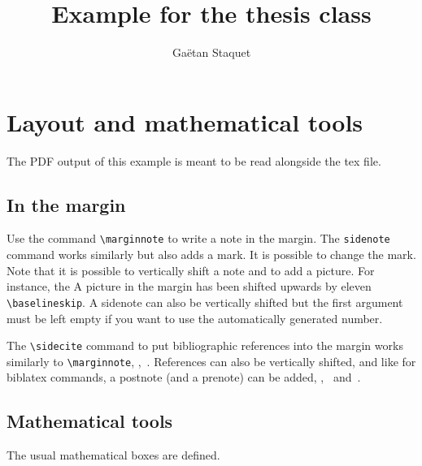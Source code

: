\documentclass[
  b5paper,
  fontsize = 11pt,
  english,
  roman equations,
]{thesis}
\title{Example for the thesis class}
\author{Gaëtan Staquet}
\begin{document}
  \frontmatter
  \maketitle

  \tableofcontents

  \mainmatter

  \chapter{Layout and mathematical tools}

  The PDF output of this example is meant to be read alongside the tex file.

  \chapterTOC

  \section{In the margin}

  Use the command \verb!\marginnote! to write a note in the margin.
  The \verb!sidenote! command works similarly but also adds a mark.
  It is possible to change the mark.
  Note that it is possible to vertically shift a note and to add a picture.
  For instance, the A picture in the margin has been shifted upwards by eleven \verb!\baselineskip!.
  A sidenote can also be vertically shifted but the first argument must be left empty if you want to use the automatically generated number.

  The \verb!\sidecite! command to put bibliographic references into the margin works similarly to \verb!\marginnote!, \eg,~.
  References can also be vertically shifted, and like for biblatex commands, a postnote (and a prenote) can be added, \eg,~ and~.

  \section{Mathematical tools}

  The usual mathematical boxes are defined.
\end{document}
